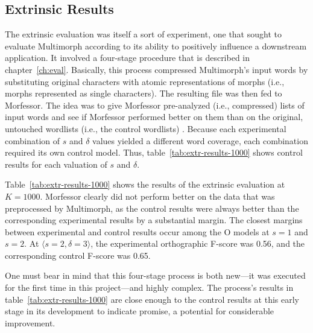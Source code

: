 {\subsection{Extrinsic Results}
\label{sec:extr-results}
The extrinsic evaluation was itself a sort of experiment, one that sought to evaluate Multimorph according to its 
ability to positively influence a downstream application. It involved a four-stage procedure that is described in 
chapter~\ref{ch:eval}.
Basically, this process compressed Multimorph's input words by substituting original characters with atomic 
representations of morphs (i.e., morphs represented as single characters). The resulting file was then fed to 
Morfessor. The idea was to give Morfessor pre-analyzed (i.e., compressed) lists of input words and
 see if Morfessor performed better on them than on the original, untouched wordlists (i.e., the control wordlists) .
%  
Because each
experimental combination of $s$ and $\delta$ values yielded a different word coverage, 
each combination required its own control model. Thus, table~\ref{tab:extr-results-1000} shows control results for each valuation of $s$ and $\delta$.
 


Table~\ref{tab:extr-results-1000} shows the results of the extrinsic evaluation at $K=1000$. 
Morfessor clearly did not perform 
better on the data that was preprocessed by Multimorph, as the control 
results were always better than the corresponding 
experimental results by a substantial margin. The closest margins between experimental and control results occur among the O models at $s = 1$ and $s = 2$. At $\langle{s}=2,\delta=3\rangle$, the experimental orthographic F-score was 0.56, and the corresponding control F-score was 0.65. 

One must bear in mind that this four-stage process is both new---it was executed for the first time in this project---and highly complex. The process's results in table~\ref{tab:extr-results-1000} are close enough to 
the control results at this early stage in its development to indicate promise, a potential for considerable improvement.


}
